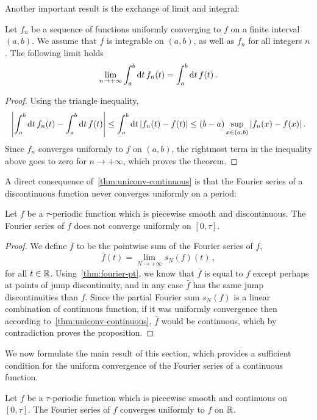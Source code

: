 Another important result is the exchange of limit and integral:
\begin{theorem}
	Let $f_n$ be a sequence of functions uniformly converging to $f$ on a finite interval
	$(a,b)$. We assume that $f$ is integrable on $(a,b)$, as well as $f_n$ for all integers
	$n$. The following limit holds
	\begin{equation}
		\lim_{n\to+\infty}\int_a^b\mathrm{d} t\,f_n(t)=\int_a^b\mathrm{d} t\,f(t)\,.
	\end{equation}
\end{theorem}
\begin{proof}
	Using the triangle inequality,
	\begin{equation}
		\left|\int_a^b\mathrm{d} t\,f_n(t)-\int_a^b\mathrm{d} t\,f(t)\right|
		\leq\int_a^b\mathrm{d} t\,|f_n(t)-f(t)|\leq (b-a)\sup_{x\in (a,b)}|f_n(x)-f(x)|\,.
	\end{equation}
	Since $f_n$ converges uniformly to $f$ on $(a,b)$, the rightmost term in the inequality
	above goes to zero for $n\to+\infty$, which proves the theorem.
\end{proof}
A direct consequence of~\cref{thm:uniconv-continuous} is that the Fourier series of a
discontinuous function never converges uniformly on a period:
\begin{proposition}
	Let $f$ be a $\tau$-periodic function which is piecewise smooth and discontinuous. The
	Fourier series of $f$ does not converge uniformly on $[0,\tau]$.
\end{proposition}
\begin{proof}
	We define $\bar{f}$ to be the pointwise sum of the Fourier series of $f$, \ie
	\begin{equation}
		\bar{f}(t)=\lim_{N\to+\infty}s_N(f)(t)\,,
	\end{equation}
	for all $t\in\mathbb{R}$. Using~\cref{thm:fourier-pt}, we know that $\bar{f}$ is equal to $f$
	except perhaps at points of jump discontinuity, and in any case $\bar{f}$ has the same
	jump discontinuities than $f$. Since the partial Fourier sum $s_N(f)$ is a linear
	combination of continuous function, if it was uniformly convergence then according
	to~\cref{thm:uniconv-continuous}, $\bar{f}$ would be continuous, which by contradiction
	proves the proposition.
\end{proof}
We now formulate the main result of this section, which provides a sufficient condition
for the uniform convergence of the Fourier series of a continuous function.
\begin{theorem}
	\label{thm:fourier-uniconv}
	Let $f$ be a $\tau$-periodic function which is piecewise smooth and continuous on
	$[0,\tau]$. The Fourier series of $f$ converges uniformly to $f$ on $\mathbb{R}$.
\end{theorem}

